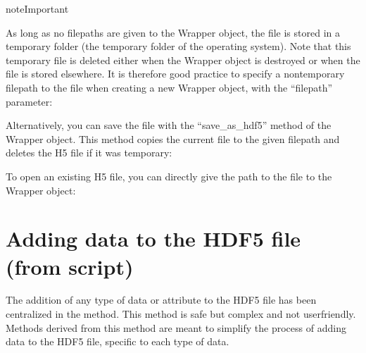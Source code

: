 \documentclass[letterpaper,10pt,english]{sphinxmanual}
\begin{document}
\begin{sphinxadmonition}{note}{Important}

\sphinxAtStartPar
As long as no filepaths are given to the Wrapper object, the file is stored in a temporary folder (the temporary folder of the operating system). Note that this temporary file is deleted either when the Wrapper object is destroyed or when the file is stored elsewhere. It is therefore good practice to specify a non\sphinxhyphen{}temporary filepath to the file when creating a new Wrapper object, with the “filepath” parameter:

\begin{sphinxVerbatim}[commandchars=\\\{\}]
    
\end{sphinxVerbatim}

\sphinxAtStartPar
Alternatively, you can save the file with the “save\_as\_hdf5” method of the Wrapper object. This method copies the current file to the given filepath and deletes the H5 file if it was temporary:

\begin{sphinxVerbatim}[commandchars=\\\{\}]
  
  
\end{sphinxVerbatim}
\end{sphinxadmonition}

\sphinxAtStartPar
To open an existing H5 file, you can directly give the path to the file to the Wrapper object:

\begin{sphinxVerbatim}[commandchars=\\\{\}]
    
\end{sphinxVerbatim}


\section{Adding data to the HDF5 file (from script)}
\label{\detokenize{source/hdf5_bls_package:adding-data-to-the-hdf5-file-from-script}}
\sphinxAtStartPar
The addition of any type of data or attribute to the HDF5 file has been centralized in the  method. This method is safe but complex and not user\sphinxhyphen{}friendly. Methods derived from this method are meant to simplify the process of adding data to the HDF5 file, specific to each type of data.
\end{document}
